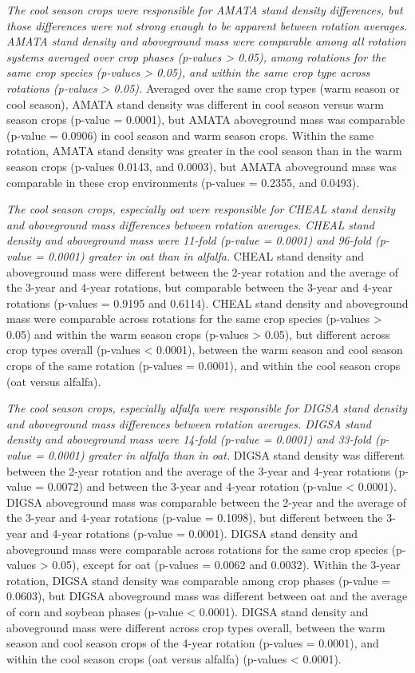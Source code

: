 \documentclass[
]{article}
\begin{document}
\emph{The cool season crops were responsible for AMATA stand density differences, but those differences were not strong enough to be apparent between rotation averages.} \emph{AMATA stand density and aboveground mass were comparable among all rotation systems averaged over crop phases (p-values \textgreater{} 0.05), among rotations for the same crop species (p-values \textgreater{} 0.05), and within the same crop type across rotations (p-values \textgreater{} 0.05).} Averaged over the same crop types (warm season or cool season), AMATA stand density was different in cool season versus warm season crops (p-value = 0.0001), but AMATA aboveground mass was comparable (p-value = 0.0906) in cool season and warm season crops. Within the same rotation, AMATA stand density was greater in the cool season than in the warm season crops (p-values 0.0143, and 0.0003), but AMATA aboveground mass was comparable in these crop environments (p-values = 0.2355, and 0.0493).

\emph{The cool season crops, especially oat were responsible for CHEAL stand density and aboveground mass differences between rotation averages. CHEAL stand density and aboveground mass were 11-fold (p-value = 0.0001) and 96-fold (p-value = 0.0001) greater in oat than in alfalfa.} CHEAL stand density and aboveground mass were different between the 2-year rotation and the average of the 3-year and 4-year rotations, but comparable between the 3-year and 4-year rotations (p-values = 0.9195 and 0.6114). CHEAL stand density and aboveground mass were comparable across rotations for the same crop species (p-values \textgreater{} 0.05) and within the warm season crops (p-values \textgreater{} 0.05), but different across crop types overall (p-values \textless{} 0.0001), between the warm season and cool season crops of the same rotation (p-values = 0.0001), and within the cool season crops (oat versus alfalfa).

\emph{The cool season crops, especially alfalfa were responsible for DIGSA stand density and aboveground mass differences between rotation averages. DIGSA stand density and aboveground mass were 14-fold (p-value = 0.0001) and 33-fold (p-value = 0.0001) greater in alfalfa than in oat.} DIGSA stand density was different between the 2-year rotation and the average of the 3-year and 4-year rotations (p-value = 0.0072) and between the 3-year and 4-year rotation (p-value \textless{} 0.0001). DIGSA aboveground mass was comparable between the 2-year and the average of the 3-year and 4-year rotations (p-value = 0.1098), but different between the 3-year and 4-year rotations (p-value = 0.0001). DIGSA stand density and aboveground mass were comparable across rotations for the same crop species (p-values \textgreater{} 0.05), except for oat (p-values = 0.0062 and 0.0032). Within the 3-year rotation, DIGSA stand density was comparable among crop phases (p-value = 0.0603), but DIGSA aboveground mass was different between oat and the average of corn and soybean phases (p-value \textless{} 0.0001). DIGSA stand density and aboveground mass were different across crop types overall, between the warm season and cool season crops of the 4-year rotation (p-values = 0.0001), and within the cool season crops (oat versus alfalfa) (p-values \textless{} 0.0001).
\end{document}
